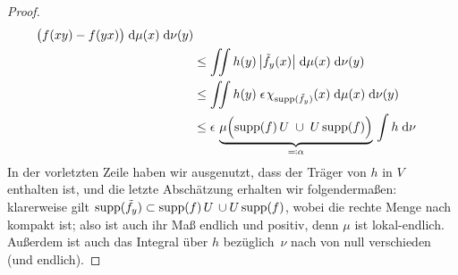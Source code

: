 \begin{proof}
\begin{align*}
{            \bigl( f(xy) - f(yx) \bigr) \dif{\mu(x)} \dif{\nu(y)} }         \\
        &\leq \iint h(y) \,                                                 %
                \abs[\big]{\tilde f_y(x)} \dif{\mu(x)} \dif{\nu(y)}         \\
        &\leq \iint h(y) \;\epsilon\mkern2mu\chi_{\supp(\tilde f_y)}(x)     %
                \dif{\mu(x)} \dif{\nu(y)}                                   \\
        &\leq \epsilon \,                                                   %
            \underbrace{ \mu\Bigl( \supp(f)\,U \;\cup\; U\supp(f)           %
            \Bigr) }_{ \eqdef \alpha }                                      %
            \, \int h \dif\nu                                               %
    \end{align*}
    In der vorletzten Zeile haben wir ausgenutzt, dass der Träger von $h$ in $V$
    enthalten ist, und die letzte Abschätzung erhalten wir folgendermaßen:
    klarerweise gilt $\operatorname{supp}(\tilde f_y) \subset \operatorname{supp}(f)\,U \,\cup U\operatorname{supp}(f)$, wobei die
    rechte Menge nach  kompakt ist; also ist
    auch ihr Maß endlich und positiv, denn $\mu$ ist lokal-endlich. Außerdem ist
    auch das Integral über $h$ be\-züg\-lich~$\nu$ nach 
    von null verschieden (und endlich).
    

\end{proof}
